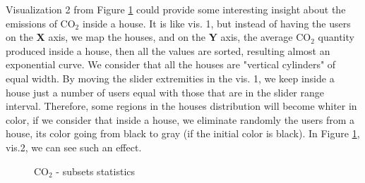 \documentclass{article}
\begin{document}
Visualization 2 from Figure \ref{fig:subsets} could provide some interesting insight about the emissions of CO${_2}$ inside a house. It is like vis. 1, but instead of having the users on the \textbf{X} axis, we map the houses, and on the \textbf{Y} axis, the average CO${_2}$ quantity produced inside a house, then all the values are sorted, resulting almost an exponential curve. We consider that all the houses are "vertical cylinders" of equal width. By moving the slider extremities in the vis. 1, we keep inside a house just a number of users equal with those that are in the slider range interval. Therefore, some regions in the houses distribution will become whiter in color, if we consider that inside a house, we eliminate randomly the users from a house, its color going from black to gray (if the initial color is black). In Figure \ref{fig:subsets}, vis.2, we can see such an effect.

\begin{figure}[H]
	\centering
	\caption{CO${_2}$ - subsets statistics}
	\label{fig:subsets}
\end{figure}
\end{document}
